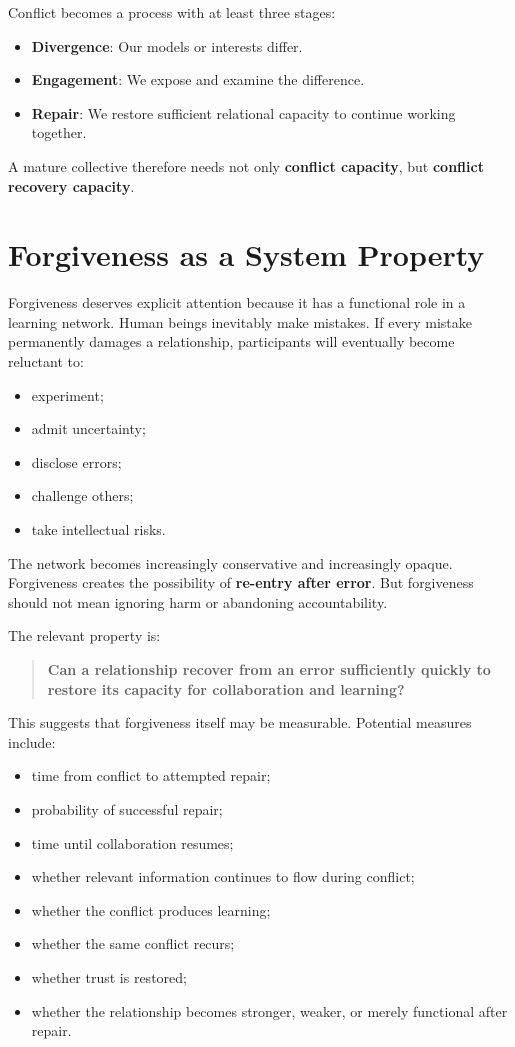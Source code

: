 \documentclass{article}
\begin{document}
Conflict becomes a process with at least three stages:
\begin{itemize}
    \item \textbf{Divergence}: Our models or interests differ.
    \item \textbf{Engagement}: We expose and examine the difference.
    \item \textbf{Repair}: We restore sufficient relational capacity to continue working together.
\end{itemize}

A mature collective therefore needs not only \textbf{conflict capacity}, but \textbf{conflict recovery capacity}.

\section{Forgiveness as a System Property}
Forgiveness deserves explicit attention because it has a functional role in a learning network. Human beings inevitably make mistakes. If every mistake permanently damages a relationship, participants will eventually become reluctant to:
\begin{itemize}
    \item experiment;
    \item admit uncertainty;
    \item disclose errors;
    \item challenge others;
    \item take intellectual risks.
\end{itemize}

The network becomes increasingly conservative and increasingly opaque. Forgiveness creates the possibility of \textbf{re-entry after error}. But forgiveness should not mean ignoring harm or abandoning accountability.

The relevant property is:
\begin{quote}
    \textbf{Can a relationship recover from an error sufficiently quickly to restore its capacity for collaboration and learning?}
\end{quote}

This suggests that forgiveness itself may be measurable. Potential measures include:
\begin{itemize}
    \item time from conflict to attempted repair;
    \item probability of successful repair;
    \item time until collaboration resumes;
    \item whether relevant information continues to flow during conflict;
    \item whether the conflict produces learning;
    \item whether the same conflict recurs;
    \item whether trust is restored;
    \item whether the relationship becomes stronger, weaker, or merely functional after repair.
\end{itemize}
\end{document}
